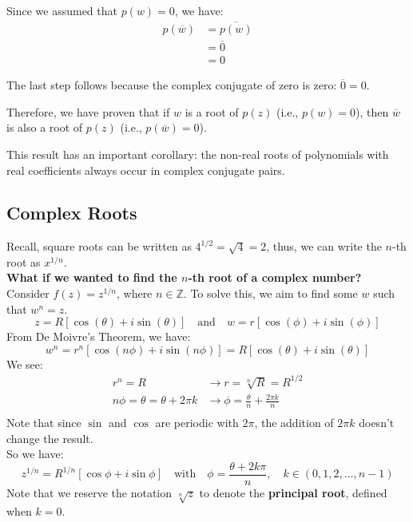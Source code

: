 \documentclass[a4paper, 10pt]{article}
\begin{document}
\begin{proofbox}
  Since we assumed that $p(w) = 0$, we have:
  \begin{align}
    p(\overline{w}) & = \overline{p(w)} \\
                    & = \overline{0}    \\
                    & = 0
  \end{align}

  The last step follows because the complex conjugate of zero is zero: $\overline{0} = 0$.

  Therefore, we have proven that if $w$ is a root of $p(z)$ (i.e., $p(w) = 0$), then $\overline{w}$ is also a root of $p(z)$ (i.e., $p(\overline{w}) = 0$).

  This result has an important corollary: the non-real roots of polynomials with real coefficients always occur in complex conjugate pairs.

\end{proofbox}

\subsection{Complex Roots}
Recall, square roots can be written as $4^{1/2} = \sqrt{4} = 2$, thus, we can write the $n$-th root as $x^{1/n}$. \\
\textbf{What if we wanted to find the $n$-th root of a complex number?} \\
Consider $f(z) = z^{1/n}$, where $n\in \mathbb{Z}$. To solve this, we aim to find some $w$ such that $w^n = z$.
$$z = R[\cos(\theta) + i \sin( \theta)] \quad \text{and} \quad w = r[\cos(\phi) + i \sin(\phi)]$$
From De Moivre's Theorem, we have:
$$w^n = r^n[\cos(n\phi) + i\sin(n\phi)] = R[\cos(\theta) + i\sin(\theta)]$$
We see:
\begin{align*}
  r^n = R                          & \rightarrow r = \sqrt[n]{R} = R^{1/2}                  \\
  n\phi = \theta = \theta + 2\pi k & \rightarrow \phi = \frac{\theta}{n} + \frac{2\pi k}{n} \\
\end{align*}
Note that since $\sin$ and $\cos$ are periodic with $2\pi$, the addition of $2\pi k$ doesn't change the result.\\
So we have:
$$z^{1/n} = R^{1/n} [\cos\phi + i \sin\phi] \quad \text{with} \quad \phi = \frac{\theta+ 2k\pi}{n}, \quad k \in (0, 1, 2, \dots, n-1)$$
Note that we reserve the notation $\sqrt[n]{z}$ to denote the \textbf{principal root}, defined when $k = 0$.
\end{document}
